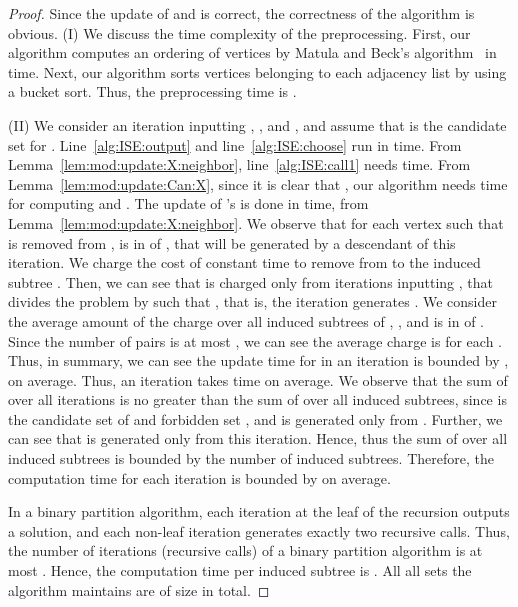 \documentclass{llncs}
\begin{document}
\begin{proof}
    Since the update of  and  is correct, 
    the correctness of the algorithm is obvious. 
(I) We discuss the time complexity of the preprocessing. 
    First, our algorithm computes an ordering of vertices 
    by Matula and Beck's algorithm~\cite{Matula:Beck:1983} 
    in  time. 
    Next, our algorithm sorts 
    vertices belonging to each adjacency list by using a bucket sort.
    Thus, the preprocessing time is . 


    (II) 
    We consider an iteration inputting , , and , and assume
    that  is the candidate set for . 
    Line~\ref{alg:ISE:output} and line~\ref{alg:ISE:choose} run in  time. 
    From Lemma~\ref{lem:mod:update:X:neighbor}, 
    line~\ref{alg:ISE:call1} needs  time. 
From Lemma~\ref{lem:mod:update:Can:X}, 
    since it is clear that ,   
    our algorithm needs  time for computing  and . 
The update of 's is done in  time, from Lemma~\ref{lem:mod:update:X:neighbor}. 
    We observe that for each vertex  
    such that  is removed from , 
     is in  of , 
    that will be generated by a descendant of this iteration.
    We charge the cost of constant time to remove  from  
    to the induced subtree . 
    Then, we can see that  is charged only from iterations inputting , 
    that divides the problem by  such that , 
    that is, the iteration generates .
    We consider the average amount of the charge over all induced subtrees of , 
    , and  is in  of . 
    Since the number of pairs  is at most , 
    we can see the average charge is  for each . 
    Thus, in summary, we can see the update time for  in an iteration is bounded by , on average.
    Thus, an iteration takes  time on average.
We observe that the sum of  over all iterations is no greater 
    than the sum of  over all induced subtrees, 
    since  is the candidate set of  and forbidden set , 
    and  is generated only from . 
    Further, we can see that  is generated only from  
    this iteration.
    Hence, 
    thus the sum of  over all induced subtrees is bounded 
    by the number of induced subtrees. 
    Therefore, 
    the computation time for each iteration is bounded by  on average. 

    In a binary partition algorithm, 
    each iteration at the leaf of the recursion 
    outputs a solution, 
    and each non-leaf iteration generates exactly two recursive calls. 
    Thus, the number of iterations (recursive calls) of a binary partition algorithm 
    is at most . 
    Hence, the computation time per induced subtree is . 
    All all sets the algorithm maintains are of size  in total. 



\end{proof}
\end{document}
